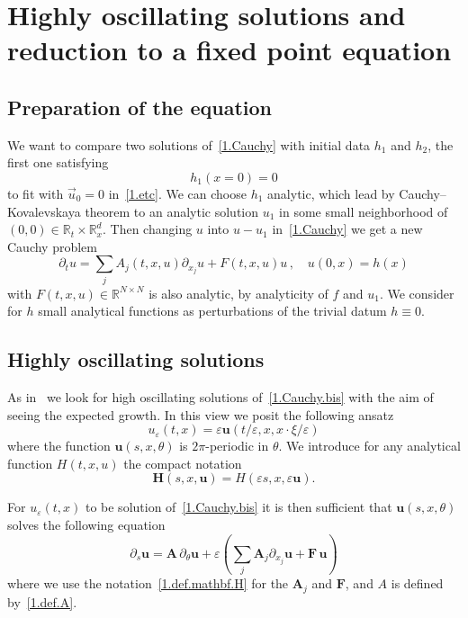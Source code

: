 \documentclass[10pt]{amsart}
\theoremstyle{definition}
\theoremstyle{plain}
\newcommand*\e{\varepsilon}
\newcommand*\R{{\mathbb R}}
\newcommand{\dptl}{\partial}%
\newcommand{\ubf}{{\mathbf u}}
\newcommand{\Hbf}{{\mathbf H}}
\begin{document}
\section{Highly oscillating solutions and reduction to a fixed point equation}\label{1.section.ansatz}



\subsection{Preparation of the equation}



We want to compare two solutions of~\eqref{1.Cauchy} with initial data $h_1$ and $h_2$, the first one satisfying
\[
h_1(x=0) = 0
\]
to fit with $\vec{u}_0 = 0$ in~\eqref{1.etc}. We can choose $h_1$ analytic, which lead by Cauchy--Kovalevskaya theorem to an analytic solution $u_1$ in some small neighborhood of $(0,0)\in\R_{t}\times\R_{x}^{d}$. Then changing $u$ into $u-u_1$ in~\eqref{1.Cauchy} we get a new Cauchy problem
\begin{equation}\label{1.Cauchy.bis}
\dptl_{t}u = \sum_{j}A_{j}(t,x,u)\dptl_{x_j}{u} + F(t,x,u)u \,, \quad u(0,x) = h(x)
\end{equation}
with $F(t,x,u)\in\R^{N\times N}$ is also analytic, by analyticity of $f$ and $u_1$. We consider for $h$ small analytical functions as perturbations of the trivial datum $h\equiv 0$.



\subsection{Highly oscillating solutions}



As in~\cite{metivier2005remarks} we look for high oscillating solutions of~\eqref{1.Cauchy.bis} with the aim of seeing the expected growth. In this view we posit the following ansatz
\begin{equation}\label{1.ansatz}
u_{\e}(t,x) = \e \ubf(t/\e,x,x\cdot\xi/\e)
\end{equation}
where the function $\ubf(s,x,\theta)$ is $2\pi$-periodic in $\theta$. We introduce for any analytical function $H(t,x,u)$ the compact notation
\begin{equation}\label{1.def.mathbf.H}
\Hbf(s,x,\ubf) = H\left(\e s,x,\e\ubf\right).
\end{equation}


For $u_{\e}(t,x)$ to be solution of~\eqref{1.Cauchy.bis} it is then sufficient that $\ubf(s,x,\theta)$ solves the following equation
\begin{equation}\label{1.ds.u.passager}
\dptl_{s} \ubf = {\mathbf A}\,\dptl_{\theta} \ubf + \e\left(\sum_j {\mathbf A}_j \dptl_{x_j} \ubf + {\mathbf F} \, \ubf\right)
\end{equation}
where we use the notation~\eqref{1.def.mathbf.H} for the $\mathbf{A}_j$ and $\mathbf{F}$, and $A$ is defined by~\eqref{1.def.A}.
\end{document}
